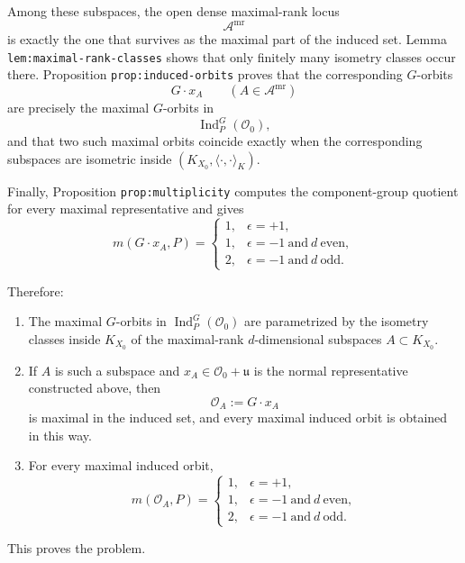 \documentclass[
  11pt,
]{article}
\begin{document}
Among these subspaces, the open dense maximal-rank locus \[
\mathscr A^{\mathrm{mr}}
\] is exactly the one that survives as the maximal part of the induced
set. Lemma \texttt{lem:maximal-rank-classes} shows that only finitely
many isometry classes occur there. Proposition
\texttt{prop:induced-orbits} proves that the corresponding \(G\)-orbits
\[
G\cdot x_A \qquad (A\in \mathscr A^{\mathrm{mr}})
\] are precisely the maximal \(G\)-orbits in \[
\operatorname{Ind}_P^G(\mathcal O_0),
\] and that two such maximal orbits coincide exactly when the
corresponding subspaces are isometric inside
\((K_{X_0},\langle\cdot,\cdot\rangle_K)\).

Finally, Proposition \texttt{prop:multiplicity} computes the
component-group quotient for every maximal representative and gives \[
m(G\cdot x_A,P)=
\begin{cases}
1,& \epsilon=+1,\\[0.4ex]
1,& \epsilon=-1\ \text{and}\ d\ \text{even},\\[0.4ex]
2,& \epsilon=-1\ \text{and}\ d\ \text{odd}.
\end{cases}
\]

Therefore:

\begin{enumerate}
\def\labelenumi{\arabic{enumi}.}
\item
  The maximal \(G\)-orbits in \(\operatorname{Ind}_P^G(\mathcal O_0)\)
  are parametrized by the isometry classes inside \(K_{X_0}\) of the
  maximal-rank \(d\)-dimensional subspaces \(A\subset K_{X_0}\).
\item
  If \(A\) is such a subspace and \(x_A\in \mathcal O_0+\mathfrak u\) is
  the normal representative constructed above, then \[
  \mathcal O_A:=G\cdot x_A
  \] is maximal in the induced set, and every maximal induced orbit is
  obtained in this way.
\item
  For every maximal induced orbit, \[
  m(\mathcal O_A,P)=
  \begin{cases}
  1,& \epsilon=+1,\\[0.4ex]
  1,& \epsilon=-1\ \text{and}\ d\ \text{even},\\[0.4ex]
  2,& \epsilon=-1\ \text{and}\ d\ \text{odd}.
  \end{cases}
  \]
\end{enumerate}

This proves the problem.
\end{document}
